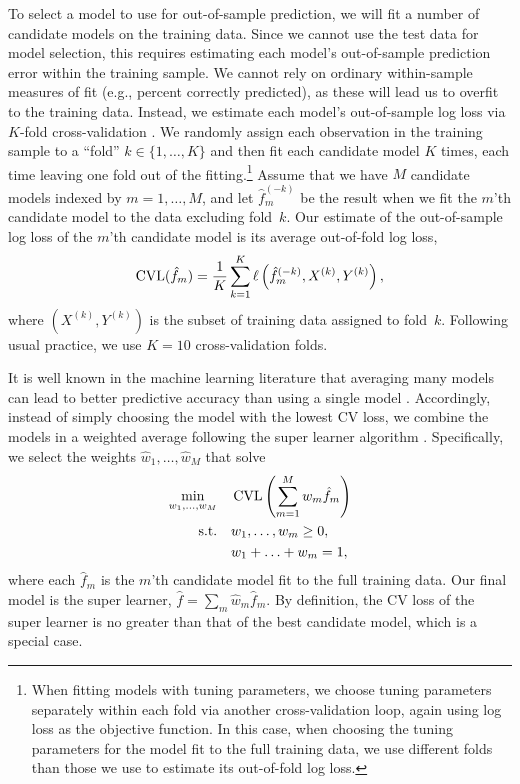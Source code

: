 To select a model to use for out-of-sample prediction, we will fit a number of candidate models on the training data.
Since we cannot use the test data for model selection, this requires estimating each model's out-of-sample prediction error within the training sample.
We cannot rely on ordinary within-sample measures of fit (e.g., percent correctly predicted), as these will lead us to overfit to the training data.
Instead, we estimate each model's out-of-sample log loss via $K$-fold cross-validation \citep[241--249]{Hastie:2009wpa}.
We randomly assign each observation in the training sample to a ``fold'' $k \in \{1, \ldots, K\}$ and then fit each candidate model $K$ times, each time leaving one fold out of the fitting.\footnote{
  When fitting models with tuning parameters, we choose tuning parameters separately within each fold via another cross-validation loop, again using log loss as the objective function.
  In this case, when choosing the tuning parameters for the model fit to the full training data, we use different folds than those we use to estimate its out-of-fold log loss.
}
Assume that we have $M$ candidate models indexed by $m = 1, \ldots, M$, and let $\hat{f}_m^{(-k)}$ be the result when we fit the $m$'th candidate model to the data excluding fold~$k$.
Our estimate of the out-of-sample log loss of the $m$'th candidate model is its average out-of-fold log loss,
\begin{equation}
  \label{eq:cv-loss}
  \operatorname{CVL}(\hat{f}_m)
  =
  \frac{1}{K} \sum_{k=1}^K \ell \left(
    \hat{f}_m^{(-k)}, X^{(k)}, Y^{(k)}
  \right),
\end{equation}
where $(X^{(k)}, Y^{(k)})$ is the subset of training data assigned to fold~$k$.
Following usual practice, we use $K = 10$ cross-validation folds.

It is well known in the machine learning literature that averaging many models can lead to better predictive accuracy than using a single model \citep{breiman_bagging_1996}.
Accordingly, instead of simply choosing the model with the lowest CV loss, we combine the models in a weighted average following the super learner algorithm \citep{vanderLaan:bz}.
Specifically, we select the weights $\hat{w}_1, \ldots, \hat{w}_M$ that solve
\begin{equation}
  \label{eq:super-learner}
  \begin{aligned}
    \min_{w_1, \ldots, w_M}
    &\quad
    \operatorname{CVL} \left(
      \sum_{m=1}^M w_m \hat{f}_m
    \right)
    \\
    \mbox{s.t.}
    &\quad
    w_1, \ldots, w_m \geq 0,
    \\
    &\quad
    w_1 + \ldots + w_m = 1,
  \end{aligned}
\end{equation}
where each $\hat{f}_m$ is the $m$'th candidate model fit to the full training data.
Our final model is the super learner, $\hat{f} = \sum_m \hat{w}_m \hat{f}_m$.
By definition, the CV loss of the super learner is no greater than that of the best candidate model, which is a special case.


